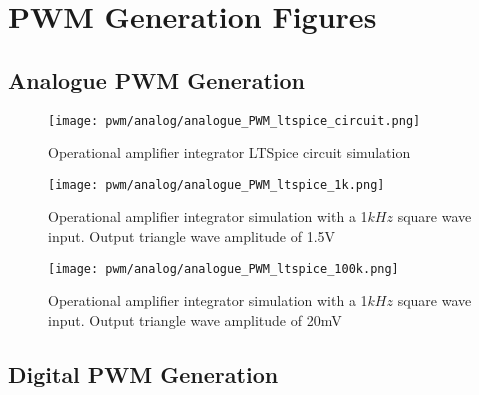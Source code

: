 \chapter{PWM Generation Figures} \label{A:PWM}

\section{Analogue PWM Generation} \label{A:analogue_PWM}

\begin{figure}[H]
    \begin{center}
        \texttt{[image: pwm/analog/analogue\_PWM\_ltspice\_circuit.png]}
        \caption{Operational amplifier integrator LTSpice circuit simulation}
    \end{center}
    \vspace{-10pt}
\end{figure}
    
\begin{figure}[H]
    \texttt{[image: pwm/analog/analogue\_PWM\_ltspice\_1k.png]}
    \caption{Operational amplifier integrator simulation with a 1$kHz$ square wave input. Output triangle wave amplitude of 1.5V}
    \vspace{-10pt}
\end{figure}

\begin{figure}[H]
    \texttt{[image: pwm/analog/analogue\_PWM\_ltspice\_100k.png]}
    \caption{Operational amplifier integrator simulation with a 1$kHz$ square wave input. Output triangle wave amplitude of 20mV}
    \vspace{-10pt}
\end{figure}
    

\section{Digital PWM Generation} \label{A:digital_PWM}

